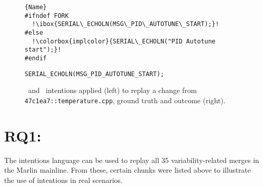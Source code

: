 \begin{figure}[ht]
    \centering
    \begin{minipage}{.50\textwidth}
\begin{lstlisting}[caption=Wrapped code by PC,escapechar=!]{Name}
#ifndef FORK
  !\ibox{SERIAL\_ECHOLN(MSG\_PID\_AUTOTUNE\_START);}!
#else
  !\colorbox{implcolor}{SERIAL\_ECHOLN("PID Autotune start");}!
#endif
\end{lstlisting}
\end{minipage}\qquad
\begin{minipage}{.55\textwidth}
\begin{lstlisting}
SERIAL_ECHOLN(MSG_PID_AUTOTUNE_START);
\end{lstlisting}

    \end{minipage}
    \caption{\colorbox{shadecolor}{\keep}~and \colorbox{implcolor}{\remove}~intentions applied (left) to replay a change from \texttt{47c1ea7::temperature.cpp}, ground truth and outcome (right).}
    \label{fig:keep-remove}
\end{figure}

\section{RQ1: \RQA}
The intentions language can be used to replay all 35 variability-related merges in the Marlin mainline. From these, certain chunks were listed above to illustrate the use of intentions in real scenarios.


